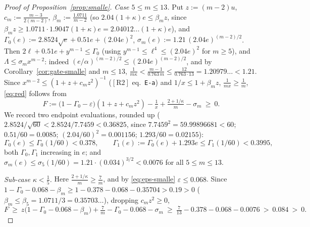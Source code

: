 \documentclass[11pt]{amsart}
\newcommand{\eps}{\varepsilon}
\newcommand{\RII}{[\textrm{R2}]}
\begin{document}
\begin{proof}[Proof of Proposition~\ref{prop:smalle}]
\emph{Case $5\le m\le13$.}  Put $z:=(m-2)u$, $c_m:=\tfrac{m-3}{2(m-2)}$,
$\beta_m:=\tfrac{1.0711}{m-2}$ (so $2.04(1+\kappa)e\le\beta_m z$, since
$\beta_mz\ge1.0711\cdot1.9047(1+\kappa)e=2.04012\ldots(1+\kappa)e$), and
$\Gamma_0(e):=2.8524\sqrt e+0.51e+(2.04e)^2$,
$\sigma_m(e):=1.21\,(2.04e)^{(m-2)/2}$.  Then
$2\ell+0.51e+y^{m-1}\le\Gamma_0$ (using $y^{m-1}\le\ell^4\le(2.04e)^2$ for
$m\ge5$), and $\Lambda\le\sigma_mx^{m-2}$: indeed
$(e/\alpha)^{(m-2)/2}\le(2.04e)^{(m-2)/2}$, and by
Corollary~\ref{cor:gate-smalle} and $m\le13$,
$\tfrac1{m\kappa}<\tfrac{m-1}{0.763\,m}\le\tfrac{12}{0.763\cdot13}=1.20979\ldots<1.21$.
Since $x^{m-2}\le(1+z+c_mz^2)^{-1}$ ($\RII$ eq.~\texttt{E-a}) and
$1/x\le1+\beta_mz$, $\tfrac1{mx}\ge\tfrac1m$, \eqref{eq:red} follows from
\begin{equation}\label{eq:F}
 F:=\bigl(1-\Gamma_0-\eps\bigr)(1+z+c_mz^2)-\tfrac1x+\tfrac{2+1/\kappa}m-\sigma_m\ \ge\ 0 .
\end{equation}
We record two endpoint evaluations, rounded up
($2.8524/\sqrt{60}<2.8524/7.7459<0.36825$, since $7.7459^2=59.99896681<60$;
$0.51/60=0.0085$; $(2.04/60)^2=0.001156$; $1.293/60=0.02155$):
\begin{equation}\label{eq:G-ends}
 \Gamma_0(e)\le\Gamma_0(1/60)<0.378,\qquad
 \Gamma_1(e):=\Gamma_0(e)+1.293e\le\Gamma_1(1/60)<0.3995,
\end{equation}
both $\Gamma_0,\Gamma_1$ increasing in $e$; and
$\sigma_m(e)\le\sigma_5(1/60)=1.21\cdot(0.034)^{3/2}<0.0076$ for all
$5\le m\le13$.

\emph{Sub-case $\kappa<\tfrac15$.}  Here $\tfrac{2+1/\kappa}m\ge\tfrac7m$, and
by \eqref{eq:eps-smalle} $\eps\le0.068$.  Since
$1-\Gamma_0-0.068-\beta_m\ge1-0.378-0.068-0.35704>0.19>0$
($\beta_m\le\beta_5=1.0711/3=0.35703\ldots$), dropping $c_mz^2\ge0$,
\[
 F\ \ge\ z\bigl(1-\Gamma_0-0.068-\beta_m\bigr)+\tfrac7m-\Gamma_0-0.068-\sigma_m
 \ \ge\ \tfrac7{13}-0.378-0.068-0.0076\ >\ 0.084\ >\ 0 .
\]


\end{proof}
\end{document}
